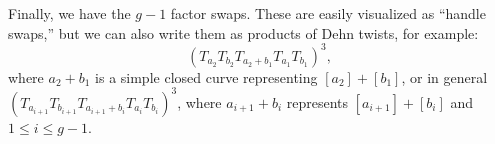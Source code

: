 \documentclass[11pt]{article}
\begin{document}
Finally, we have the $g-1$ factor swaps.  These are easily visualized as 
``handle swaps,'' but we can also write them as 
products of Dehn twists, for example:
\[ (T_{a_2}T_{b_2} T_{a_2+b_1} T_{a_1} T_{b_1})^3, \]
where $a_2+b_1$ is a simple closed curve representing $[a_2]+[b_1]$, or in 
general $(T_{a_{i+1}}T_{b_{i+1}} T_{a_{i+1}+b_i}T_{a_i}T_{b_i})^3$, where 
$a_{i+1}+b_i$ represents $[a_{i+1}]+[b_i]$ and $1 \leq i \leq g-1$.
 
\end{document}
